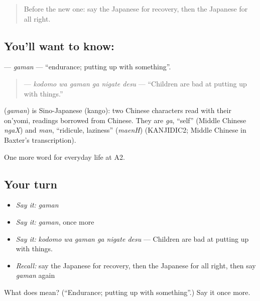 \label{lesson:JA-C222-gaman}



\begin{quote}
Before the new one: say the Japanese for recovery, then the Japanese for all right.
\end{quote}

\subsection*{You'll want to know: }
\textbf{} — \emph{gaman} — \textquotedblleft{}endurance; putting up with something\textquotedblright{}.

\begin{quote}
\textbf{  } — \emph{kodomo wa gaman ga nigate desu} — \textquotedblleft{}Children are bad at putting up with things.\textquotedblright{}
\end{quote}

\begin{cousinweb}
\textbf{} (\emph{gaman}) is Sino-Japanese (kango): two Chinese characters read with their on'yomi, readings borrowed from Chinese. They are \emph{ga}, \textquotedblleft{}self\textquotedblright{} (Middle Chinese \emph{ngaX}) and \emph{man}, \textquotedblleft{}ridicule, laziness\textquotedblright{} (\emph{maenH}) (KANJIDIC2; Middle Chinese in Baxter's transcription).
\end{cousinweb}

\begin{grammarlens}[title={What you've built}]
One more word for everyday life at A2.
\end{grammarlens}

\subsection*{Your turn}
\begin{itemize}
\raggedright
  \item \emph{Say it:} \emph{gaman}
  \item \emph{Say it:} \emph{gaman}, once more
  \item \emph{Say it:} \emph{kodomo wa gaman ga nigate desu} — Children are bad at putting up with things.
  \item \emph{Recall:} say the Japanese for recovery, then the Japanese for all right, then say \emph{gaman} again
\end{itemize}

\begin{tcolorbox}[breakable,colback=teal!4,colframe=teal!35!black,title={Before you move on}]
What does  mean? (\textquotedblleft{}Endurance; putting up with something\textquotedblright{}.) Say it once more.
\end{tcolorbox}
